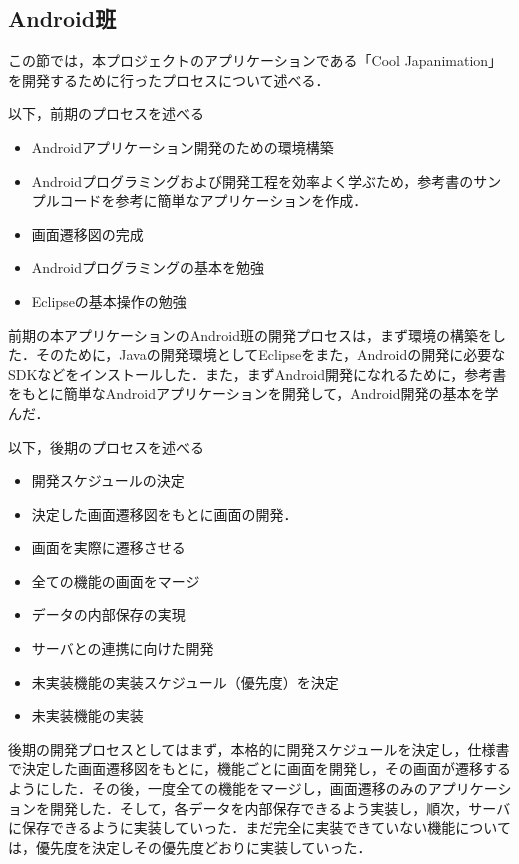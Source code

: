 \subsection{Android班}
\par この節では，本プロジェクトのアプリケーションである「Cool Japanimation」を開発するために行ったプロセスについて述べる．
\par 以下，前期のプロセスを述べる
\begin{itemize}
\item Androidアプリケーション開発のための環境構築
\item Androidプログラミングおよび開発工程を効率よく学ぶため，参考書のサンプルコードを参考に簡単なアプリケーションを作成．
\item 画面遷移図の完成
\item Androidプログラミングの基本を勉強
\item Eclipseの基本操作の勉強
\end{itemize}

\par
前期の本アプリケーションのAndroid班の開発プロセスは，まず環境の構築をした．そのために，Javaの開発環境としてEclipseをまた，Androidの開発に必要なSDKなどをインストールした．また，まずAndroid開発になれるために，参考書をもとに簡単なAndroidアプリケーションを開発して，Android開発の基本を学んだ．

\par 
以下，後期のプロセスを述べる
\begin{itemize}
\item 開発スケジュールの決定
\item 決定した画面遷移図をもとに画面の開発．
\item 画面を実際に遷移させる
\item 全ての機能の画面をマージ
\item データの内部保存の実現
\item サーバとの連携に向けた開発
\item 未実装機能の実装スケジュール（優先度）を決定
\item 未実装機能の実装
\end{itemize}

\par
後期の開発プロセスとしてはまず，本格的に開発スケジュールを決定し，仕様書で決定した画面遷移図をもとに，機能ごとに画面を開発し，その画面が遷移するようにした．その後，一度全ての機能をマージし，画面遷移のみのアプリケーションを開発した．そして，各データを内部保存できるよう実装し，順次，サーバに保存できるように実装していった．まだ完全に実装できていない機能については，優先度を決定しその優先度どおりに実装していった．

